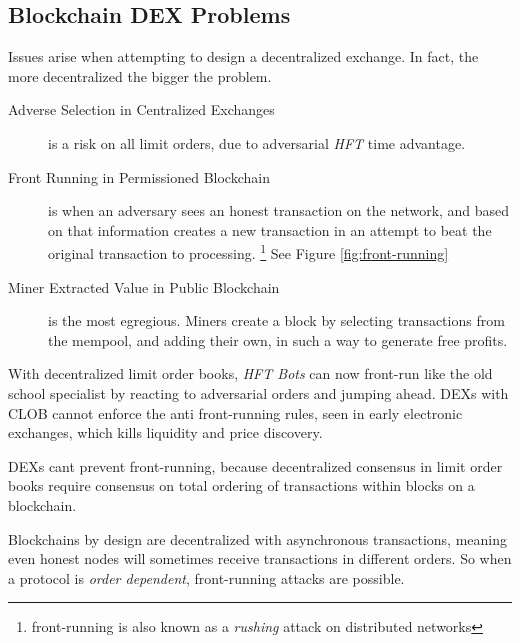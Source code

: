 \documentclass[12pt]{article}
\begin{document}
 
\subsection*{Blockchain DEX Problems}

Issues arise when attempting to design a decentralized exchange. In fact, the more decentralized the bigger the problem. 

\begin{description}
\item[Adverse Selection in Centralized Exchanges] is a risk on all limit orders, due to adversarial \emph{HFT} time advantage. 
\item[Front Running in Permissioned Blockchain] is when an adversary sees an honest transaction on the network, and based on that information creates a new transaction in an attempt to beat the original transaction to processing. \footnote{front-running is also known as a \emph{rushing} attack on distributed networks} See Figure \ref{fig:front-running} \cite{Eskandari} 
\item[Miner Extracted Value in Public Blockchain] is the most egregious. Miners create a block by selecting transactions from the mempool, and adding their own, in such a way to generate free profits. 
\end{description}

With decentralized limit order books, \emph{HFT Bots} can now front-run like the old school specialist by reacting to adversarial orders and jumping ahead. 
DEXs with CLOB cannot enforce the anti front-running rules, seen in early electronic exchanges, which kills liquidity and price discovery. 

DEXs cant prevent front-running, because decentralized consensus in limit order books require consensus on total ordering of transactions within blocks on a blockchain.

Blockchains by design are decentralized with asynchronous transactions, meaning even honest nodes will sometimes receive transactions in different orders. So when a protocol is \emph{order dependent}, front-running attacks are possible.
\end{document}
